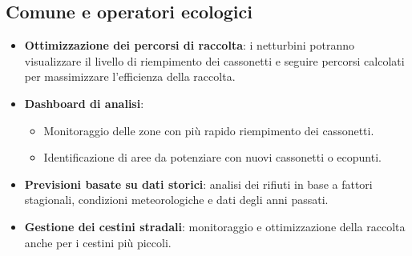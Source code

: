 \subsection{Comune e operatori ecologici}
\begin{itemize}
    \item \textbf{Ottimizzazione dei percorsi di raccolta}: i netturbini potranno visualizzare il livello di riempimento dei cassonetti e seguire percorsi calcolati per massimizzare l'efficienza della raccolta.
    \item \textbf{Dashboard di analisi}:
    \begin{itemize}
        \item Monitoraggio delle zone con pi\`u rapido riempimento dei cassonetti.
        \item Identificazione di aree da potenziare con nuovi cassonetti o ecopunti.
    \end{itemize}
    \item \textbf{Previsioni basate su dati storici}: analisi dei rifiuti in base a fattori stagionali, condizioni meteorologiche e dati degli anni passati.
    \item \textbf{Gestione dei cestini stradali}: monitoraggio e ottimizzazione della raccolta anche per i cestini pi\`u piccoli.
\end{itemize}

